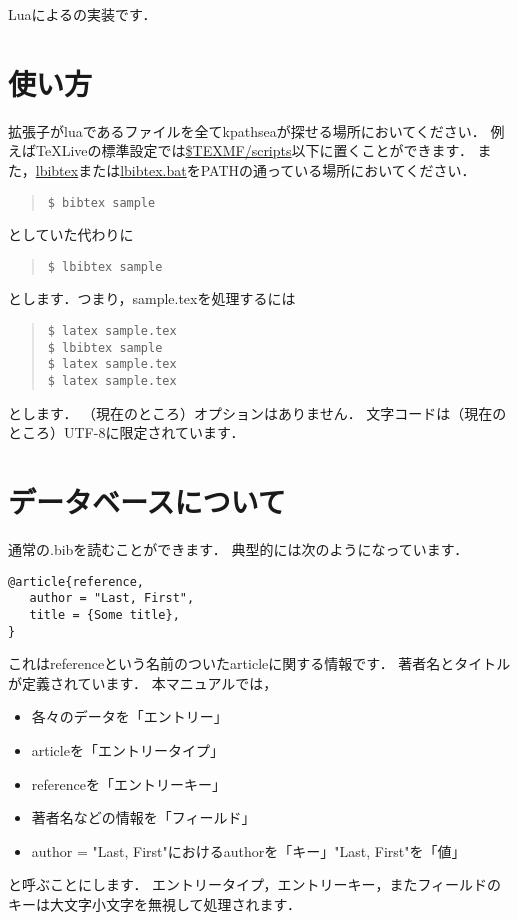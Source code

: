 \documentclass[a4paper]{ltjsarticle}
\title{\LBibTeX}
\date{}
\begin{document}
\maketitle
Luaによる\BibTeX の実装です．

\section{使い方}
拡張子がluaであるファイルを全てkpathseaが探せる場所においてください．
例えばTeXLiveの標準設定では\url{$TEXMF/scripts}以下に置くことができます．%
また，\url{lbibtex}または\url{lbibtex.bat}をPATHの通っている場所においてください．

\begin{quote}
\verb|$ bibtex sample|
\end{quote}
としていた代わりに
\begin{quote}
\verb|$ lbibtex sample|
\end{quote}
とします．つまり，sample.texを処理するには
\begin{quote}
\begin{verbatim}
$ latex sample.tex
$ lbibtex sample
$ latex sample.tex
$ latex sample.tex
\end{verbatim}
\end{quote}
とします．
（現在のところ）オプションはありません．
文字コードは（現在のところ）UTF-8に限定されています．



\section{データベースについて}
通常の.bibを読むことができます．
典型的には次のようになっています．
\begin{verbatim}
@article{reference,
   author = "Last, First",
   title = {Some title},
}
\end{verbatim}
これはreferenceという名前のついたarticleに関する情報です．
著者名とタイトルが定義されています．
本マニュアルでは，
\begin{itemize}
\item 各々のデータを「エントリー」
\item articleを「エントリータイプ」
\item referenceを「エントリーキー」
\item 著者名などの情報を「フィールド」
\item author = "Last, First"におけるauthorを「キー」"Last, First"を「値」
\end{itemize}
と呼ぶことにします．
エントリータイプ，エントリーキー，またフィールドのキーは大文字小文字を無視して処理されます．
\end{document}
